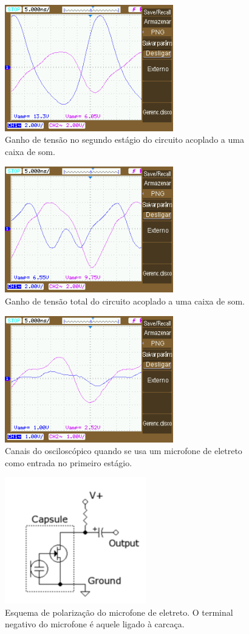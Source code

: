 \documentclass{article}
\begin{document}
    \begin{figure}[h!]
        \centering
        \includegraphics[height=5.5cm]{imgSource/NewFile8.png}
        \caption{Ganho de tensão no segundo estágio do circuito acoplado a uma caixa de som.}
        \label{fig:NewFile8}
    \end{figure}
    
    \begin{figure}[h!]
        \centering
        \includegraphics[height=5.5cm]{imgSource/NewFile9.png}
        \caption{Ganho de tensão total do circuito acoplado a uma caixa de som.}
        \label{fig:NewFile9}
    \end{figure}
    
    \begin{figure}[h!]
        \centering
        \includegraphics[height=5.5cm]{imgSource/NewFile11.png}
        \caption{Canais do osciloscópico quando se usa um microfone de eletreto como entrada no primeiro estágio.}
        \label{fig:NewFile11}
    \end{figure}
    
    \begin{figure}[h!]
        \centering
        \includegraphics[height=5.5cm]{imgSource/circuitoMicro.png}
        \caption{Esquema de polarização do microfone de eletreto. O terminal negativo do microfone é aquele ligado à carcaça.}
        \label{fig:circuitoMicro}
    \end{figure}
\end{document}
